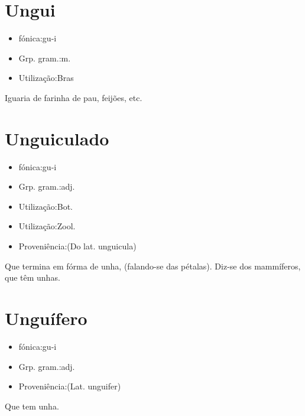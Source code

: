 \documentclass{article}
\begin{document}
\section{Ungui}
\begin{itemize}
\item {fónica:gu-i}
\end{itemize}
\begin{itemize}
\item {Grp. gram.:m.}
\end{itemize}
\begin{itemize}
\item {Utilização:Bras}
\end{itemize}
Iguaria de farinha de pau, feijões, etc.
\section{Unguiculado}
\begin{itemize}
\item {fónica:gu-i}
\end{itemize}
\begin{itemize}
\item {Grp. gram.:adj.}
\end{itemize}
\begin{itemize}
\item {Utilização:Bot.}
\end{itemize}
\begin{itemize}
\item {Utilização:Zool.}
\end{itemize}
\begin{itemize}
\item {Proveniência:(Do lat. \textunderscore unguicula\textunderscore )}
\end{itemize}
Que termina em fórma de unha, (falando-se das pétalas).
Diz-se dos mammíferos, que têm unhas.
\section{Unguífero}
\begin{itemize}
\item {fónica:gu-i}
\end{itemize}
\begin{itemize}
\item {Grp. gram.:adj.}
\end{itemize}
\begin{itemize}
\item {Proveniência:(Lat. \textunderscore unguifer\textunderscore )}
\end{itemize}
Que tem unha.
\end{document}
